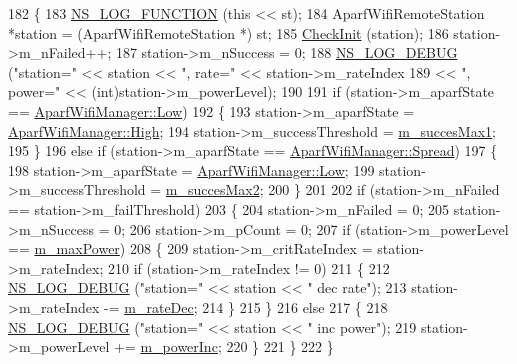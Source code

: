 \begin{DoxyCode}
182 \{
183   \hyperlink{log-macros-disabled_8h_a90b90d5bad1f39cb1b64923ea94c0761}{NS\_LOG\_FUNCTION} (\textcolor{keyword}{this} << st);
184   AparfWifiRemoteStation *station = (AparfWifiRemoteStation *) st;
185   \hyperlink{classns3_1_1AparfWifiManager_a98a3fc4dfff3bcc1bc452dfed963576f}{CheckInit} (station);
186   station->m\_nFailed++;
187   station->m\_nSuccess = 0;
188   \hyperlink{group__logging_ga413f1886406d49f59a6a0a89b77b4d0a}{NS\_LOG\_DEBUG} (\textcolor{stringliteral}{"station="} << station << \textcolor{stringliteral}{", rate="} << station->m\_rateIndex
189                            << \textcolor{stringliteral}{", power="} << (\textcolor{keywordtype}{int})station->m\_powerLevel);
190 
191   \textcolor{keywordflow}{if} (station->m\_aparfState == \hyperlink{classns3_1_1AparfWifiManager_a5b338779a4468212d544d6830f1a8237adfadee30861b99e197d83af798d5e8b9}{AparfWifiManager::Low})
192     \{
193       station->m\_aparfState = \hyperlink{classns3_1_1AparfWifiManager_a5b338779a4468212d544d6830f1a8237a350c9255ae87bc64460977ff6aa9b45d}{AparfWifiManager::High};
194       station->m\_successThreshold = \hyperlink{classns3_1_1AparfWifiManager_ab192aa4160ffefa93e47301ad682ccaa}{m\_succesMax1};
195     \}
196   \textcolor{keywordflow}{else} \textcolor{keywordflow}{if} (station->m\_aparfState == \hyperlink{classns3_1_1AparfWifiManager_a5b338779a4468212d544d6830f1a8237aaad961d0bc4608abdca01806c95e059b}{AparfWifiManager::Spread})
197     \{
198       station->m\_aparfState = \hyperlink{classns3_1_1AparfWifiManager_a5b338779a4468212d544d6830f1a8237adfadee30861b99e197d83af798d5e8b9}{AparfWifiManager::Low};
199       station->m\_successThreshold = \hyperlink{classns3_1_1AparfWifiManager_a8dc983de90c996a4ca0face8366f8bf7}{m\_succesMax2};
200     \}
201 
202   \textcolor{keywordflow}{if} (station->m\_nFailed == station->m\_failThreshold)
203     \{
204       station->m\_nFailed = 0;
205       station->m\_nSuccess = 0;
206       station->m\_pCount = 0;
207       \textcolor{keywordflow}{if} (station->m\_powerLevel == \hyperlink{classns3_1_1AparfWifiManager_a732bf09011390e3a9ca7f703d847215e}{m\_maxPower})
208         \{
209           station->m\_critRateIndex = station->m\_rateIndex;
210           \textcolor{keywordflow}{if} (station->m\_rateIndex != 0)
211             \{
212               \hyperlink{group__logging_ga413f1886406d49f59a6a0a89b77b4d0a}{NS\_LOG\_DEBUG} (\textcolor{stringliteral}{"station="} << station << \textcolor{stringliteral}{" dec rate"});
213               station->m\_rateIndex -= \hyperlink{classns3_1_1AparfWifiManager_a829dd14adfa5d780b324f7dca7f37362}{m\_rateDec};
214             \}
215         \}
216       \textcolor{keywordflow}{else}
217         \{
218           \hyperlink{group__logging_ga413f1886406d49f59a6a0a89b77b4d0a}{NS\_LOG\_DEBUG} (\textcolor{stringliteral}{"station="} << station << \textcolor{stringliteral}{" inc power"});
219           station->m\_powerLevel += \hyperlink{classns3_1_1AparfWifiManager_aa9276b0b5e0bfdf2b9d81e2c2a46f6a3}{m\_powerInc};
220         \}
221     \}
222 \}
\end{DoxyCode}


